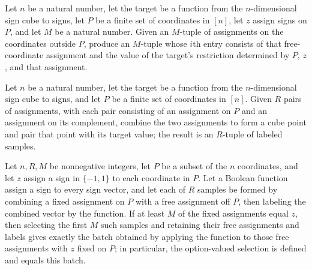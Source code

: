\begin{definition}
\label{FABL.juntaRestrictionLabeledBatch}
\leanok
{}
Let $n$ be a natural number, let the target be a function from the $n$-dimensional sign
cube to signs, let $P$ be a finite set of coordinates in $[n]$, let $z$ assign signs on
$P$, and let $M$ be a natural number. Given an $M$-tuple of assignments on the
coordinates outside $P$, produce an $M$-tuple whose $i$th entry consists of that
free-coordinate assignment and the value of the target's restriction determined by $P$,
$z$, and that assignment.
\end{definition}

\begin{definition}
\label{FABL.juntaLabeledSamplesFromSplit}
\leanok
{}
Let $n$ be a natural number, let the target be a function from the $n$-dimensional sign
cube to signs, and let $P$ be a finite set of coordinates in $[n]$. Given $R$ pairs of
assignments, with each pair consisting of an assignment on $P$ and an assignment on its
complement, combine the two assignments to form a cube point and pair that point with
its target value; the result is an $R$-tuple of labeled samples.
\end{definition}

\begin{theorem}
\label{FABL.takeMatchingJuntaExamples_from_split}
\leanok
{}
Let $n,R,M$ be nonnegative integers, let $P$ be a subset of the $n$ coordinates, and let
$z$ assign a sign in $\{ -1,1 \}$ to each coordinate in $P$. Let a Boolean function
assign a sign to every sign vector, and let each of $R$ samples be formed by combining a
fixed assignment on $P$ with a free assignment off $P$, then labeling the combined
vector by the function. If at least $M$ of the fixed assignments equal $z$, then
selecting the first $M$ such samples and retaining their free assignments and labels
gives exactly the batch obtained by applying the function to those free assignments with
$z$ fixed on $P$; in particular, the option-valued selection is defined and equals this
batch.
\end{theorem}

